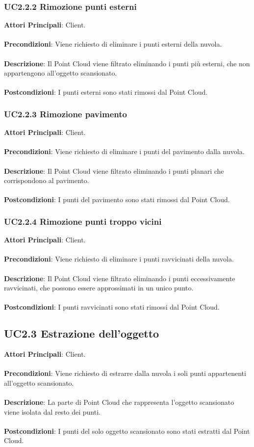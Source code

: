 \subsubsection{UC2.2.2 Rimozione punti esterni}
\textbf{Attori Principali}: Client.
\\\\ \textbf{Precondizioni}: Viene richiesto di eliminare i punti esterni della nuvola.
\\\\ \textbf{Descrizione}: Il Point Cloud viene filtrato eliminando i punti più esterni, che non appartengono all'oggetto scansionato.
\\\\ \textbf{Postcondizioni}: I punti esterni sono stati rimossi dal Point Cloud.

\subsubsection{UC2.2.3 Rimozione pavimento}
\textbf{Attori Principali}: Client.
\\\\ \textbf{Precondizioni}: Viene richiesto di eliminare i punti del pavimento dalla nuvola.
\\\\ \textbf{Descrizione}: Il Point Cloud viene filtrato eliminando i punti planari che corrispondono al pavimento.
\\\\ \textbf{Postcondizioni}: I punti del pavimento sono stati rimossi dal Point Cloud.

\subsubsection{UC2.2.4 Rimozione punti troppo vicini}
\textbf{Attori Principali}: Client.
\\\\ \textbf{Precondizioni}: Viene richiesto di eliminare i punti ravvicinati della nuvola.
\\\\ \textbf{Descrizione}: Il Point Cloud viene filtrato eliminando i punti eccessivamente ravvicinati, che possono essere approssimati in un unico punto.
\\\\ \textbf{Postcondizioni}: I punti ravvicinati sono stati rimossi dal Point Cloud.

\subsection{UC2.3 Estrazione dell'oggetto}
\textbf{Attori Principali}: Client.
\\\\ \textbf{Precondizioni}: Viene richiesto di estrarre dalla nuvola i soli punti appartenenti all'oggetto scansionato.
\\\\ \textbf{Descrizione}: La parte di Point Cloud che rappresenta l'oggetto scansionato viene isolata dal resto dei punti.
\\\\ \textbf{Postcondizioni}: I punti del solo oggetto scansionato sono stati estratti dal Point Cloud.

